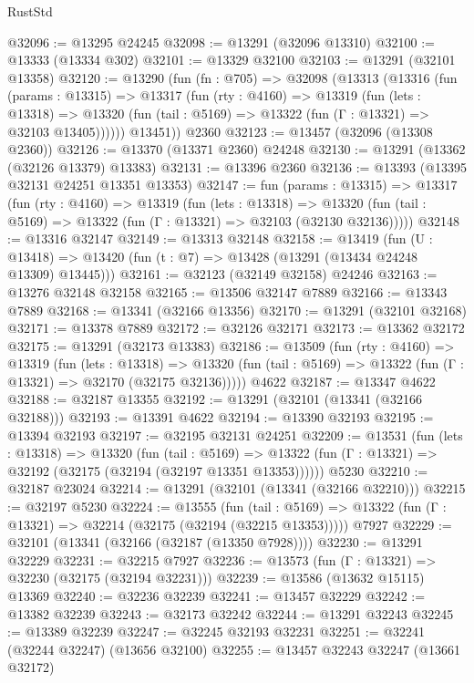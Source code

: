 \begin{lexlean}{RustStd}
\begin{coremodule}
@32096 := @13295 @24245
@32098 := @13291 (@32096 @13310)
@32100 := @13333 (@13334 @302)
@32101 := @13329 @32100
@32103 := @13291 (@32101 @13358)
@32120 := @13290
    (fun (fn : @705) =>
    @32098
      (@13313
        (@13316
          (fun (params : @13315) =>
          @13317
            (fun (rty : @4160) =>
            @13319
              (fun (lets : @13318) =>
              @13320 (fun (tail : @5169) => @13322 (fun (Γ : @13321) => @32103 @13405))))))
        @13451))
    @2360
@32123 := @13457 (@32096 (@13308 @2360))
@32126 := @13370 (@13371 @2360) @24248
@32130 := @13291 (@13362 (@32126 @13379) @13383)
@32131 := @13396 @2360
@32136 := @13393 (@13395 @32131 @24251 @13351 @13353)
@32147 := fun (params : @13315) =>
  @13317
    (fun (rty : @4160) =>
    @13319
      (fun (lets : @13318) =>
      @13320 (fun (tail : @5169) => @13322 (fun (Γ : @13321) => @32103 (@32130 @32136)))))
@32148 := @13316 @32147
@32149 := @13313 @32148
@32158 := @13419
    (fun (U : @13418) => @13420 (fun (t : @7) => @13428 (@13291 (@13434 @24248 @13309) @13445)))
@32161 := @32123 (@32149 @32158) @24246
@32163 := @13276 @32148 @32158
@32165 := @13506 @32147 @7889
@32166 := @13343 @7889
@32168 := @13341 (@32166 @13356)
@32170 := @13291 (@32101 @32168)
@32171 := @13378 @7889
@32172 := @32126 @32171
@32173 := @13362 @32172
@32175 := @13291 (@32173 @13383)
@32186 := @13509
    (fun (rty : @4160) =>
    @13319
      (fun (lets : @13318) =>
      @13320 (fun (tail : @5169) => @13322 (fun (Γ : @13321) => @32170 (@32175 @32136)))))
    @4622
@32187 := @13347 @4622
@32188 := @32187 @13355
@32192 := @13291 (@32101 (@13341 (@32166 @32188)))
@32193 := @13391 @4622
@32194 := @13390 @32193
@32195 := @13394 @32193
@32197 := @32195 @32131 @24251
@32209 := @13531
    (fun (lets : @13318) =>
    @13320
      (fun (tail : @5169) =>
      @13322 (fun (Γ : @13321) => @32192 (@32175 (@32194 (@32197 @13351 @13353))))))
    @5230
@32210 := @32187 @23024
@32214 := @13291 (@32101 (@13341 (@32166 @32210)))
@32215 := @32197 @5230
@32224 := @13555
    (fun (tail : @5169) => @13322 (fun (Γ : @13321) => @32214 (@32175 (@32194 (@32215 @13353)))))
    @7927
@32229 := @32101 (@13341 (@32166 (@32187 (@13350 @7928))))
@32230 := @13291 @32229
@32231 := @32215 @7927
@32236 := @13573 (fun (Γ : @13321) => @32230 (@32175 (@32194 @32231)))
@32239 := @13586 (@13632 @15115) @13369
@32240 := @32236 @32239
@32241 := @13457 @32229
@32242 := @13382 @32239
@32243 := @32173 @32242
@32244 := @13291 @32243
@32245 := @13389 @32239
@32247 := @32245 @32193 @32231
@32251 := @32241 (@32244 @32247) (@13656 @32100)
@32255 := @13457 @32243 @32247 (@13661 @32172)

\end{coremodule}
\end{lexlean}
